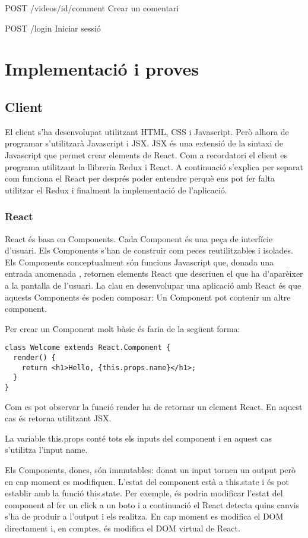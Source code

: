 \documentclass[12pt, titlepage]{article}
\begin{document}
POST /videos/{id}/comment \textrightarrow Crear un comentari

POST /login         \textrightarrow Iniciar sessió


\section{Implementació i proves}

\subsection{Client}
El client s'ha desenvolupat utilitzant HTML, CSS i Javascript. Però alhora
de programar s'utilitzarà Javascript i JSX. JSX és una extensió de la sintaxi de
Javascript que permet crear elements de React. Com a recordatori el client es
programa utilitzant la llibreria Redux i React. A continuació s'explica per
separat com funciona el React per després poder entendre perquè ens pot fer
falta utilitzar el Redux i finalment la implementació de l'aplicació.

\subsubsection{React}

React és basa en Components. Cada Component és una peça de interfície d'usuari.
Els Components s'han de construir com peces reutilitzables i isolades. Els
Components conceptualment són funcions Javascript que, donada una entrada
anomenada , retornen elements React que descriuen el que ha d'aparèixer
a la pantalla de l'usuari. La clau en desenvolupar una aplicació amb React és
que aquests Components és poden composar: Un Component pot contenir un altre
component.

Per crear un Component molt bàsic és faria de la següent forma:

\begin{lstlisting}[breaklines]
class Welcome extends React.Component {
  render() {
    return <h1>Hello, {this.props.name}</h1>;
  }
}
\end{lstlisting}

Com es pot observar la funció render ha de retornar un element React. En aquest
cas és retorna utilitzant JSX.

La variable this.props conté tots els inputs del component i en aquest cas
s'utilitza l'input name.

Els Components, doncs, són immutables: donat un input tornen un output però en
cap moment es modifiquen. L'estat del component està a this.state i és pot
establir amb la funció this.state. Per exemple, és podria modificar l'estat
del component al fer un click a un boto i a continuació el React detecta quins
canvis s'ha de produir a l'output i els realitza. En cap moment es modifica el
DOM directament i, en comptes, és modifica el DOM virtual de React.
\end{document}
